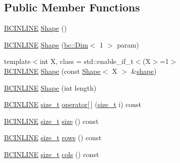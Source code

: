 \subsection*{Public Member Functions}
\begin{DoxyCompactItemize}
\item 
\hyperlink{common_8h_a6699e8b0449da5c0fafb878e59c1d4b1}{B\+C\+I\+N\+L\+I\+NE} \hyperlink{structbc_1_1Shape_3_011_01_4_a4d79bc0de238798f475ebea13919a9b3}{Shape} ()
\item 
\hyperlink{common_8h_a6699e8b0449da5c0fafb878e59c1d4b1}{B\+C\+I\+N\+L\+I\+NE} \hyperlink{structbc_1_1Shape_3_011_01_4_a2f6566fbfb4b1a94f9a7afe2e79f3909}{Shape} (\hyperlink{structbc_1_1Dim}{bc\+::\+Dim}$<$ 1 $>$ param)
\item 
{\footnotesize template$<$int X, class  = std\+::enable\+\_\+if\+\_\+t$<$(\+X$>$=1$>$ }\\\hyperlink{common_8h_a6699e8b0449da5c0fafb878e59c1d4b1}{B\+C\+I\+N\+L\+I\+NE} \hyperlink{structbc_1_1Shape_3_011_01_4_a9f9b35ec4ed652992cd18984408c748d}{Shape} (const \hyperlink{structbc_1_1Shape}{Shape}$<$ X $>$ \&\hyperlink{namespacebc_a1bc6dec532973ac024c738c0fd32cca3}{shape})
\item 
\hyperlink{common_8h_a6699e8b0449da5c0fafb878e59c1d4b1}{B\+C\+I\+N\+L\+I\+NE} \hyperlink{structbc_1_1Shape_3_011_01_4_adedf3ad67f41a40762c97de4072a2eb7}{Shape} (int length)
\item 
\hyperlink{common_8h_a6699e8b0449da5c0fafb878e59c1d4b1}{B\+C\+I\+N\+L\+I\+NE} \hyperlink{structbc_1_1Shape_3_011_01_4_a7ab1c3926651c49d726655dbaa5dc0a3}{size\+\_\+t} \hyperlink{structbc_1_1Shape_3_011_01_4_a3d578987d3b5fd178a2c7014cc9ee21a}{operator\mbox{[}$\,$\mbox{]}} (\hyperlink{structbc_1_1Shape_3_011_01_4_a7ab1c3926651c49d726655dbaa5dc0a3}{size\+\_\+t} i) const
\item 
\hyperlink{common_8h_a6699e8b0449da5c0fafb878e59c1d4b1}{B\+C\+I\+N\+L\+I\+NE} \hyperlink{structbc_1_1Shape_3_011_01_4_a7ab1c3926651c49d726655dbaa5dc0a3}{size\+\_\+t} \hyperlink{structbc_1_1Shape_3_011_01_4_a883e87e59f07399bc4843d381bbd87be}{size} () const
\item 
\hyperlink{common_8h_a6699e8b0449da5c0fafb878e59c1d4b1}{B\+C\+I\+N\+L\+I\+NE} \hyperlink{structbc_1_1Shape_3_011_01_4_a7ab1c3926651c49d726655dbaa5dc0a3}{size\+\_\+t} \hyperlink{structbc_1_1Shape_3_011_01_4_ae840c4aa1854bb3f2fb1dac050626c28}{rows} () const
\item 
\hyperlink{common_8h_a6699e8b0449da5c0fafb878e59c1d4b1}{B\+C\+I\+N\+L\+I\+NE} \hyperlink{structbc_1_1Shape_3_011_01_4_a7ab1c3926651c49d726655dbaa5dc0a3}{size\+\_\+t} \hyperlink{structbc_1_1Shape_3_011_01_4_aae101a54c18c8a5decda95aafb5a0856}{cols} () const

\end{DoxyCompactItemize}
